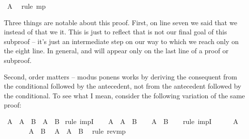 \begin{isabellebody}
\ {\isacharbackquoteopen}A{\isacharbackquoteclose}\ \isamarkupfalse%
\ {\isacharparenleft}rule\ mp{\isacharparenright}\isanewline
\ \ \isamarkupfalse%
\isanewline
{}\isamarkupfalse%
%
\endisatagproof
{\isafoldproof}%
%
\isadelimproof
%
\endisadelimproof
%
\begin{isamarkuptext}%
Three things are notable about this proof. First, on line seven we said that we 
  instead of that we  it. This is just to reflect that 
is not our final goal of this subproof -- it's just an intermediate step on our way to 
which we reach only on the eight line. In general,  and  will appear only
on the last line of a proof or subproof.%
\end{isamarkuptext}\isamarkuptrue%
%
\begin{isamarkuptext}%
Second, order matters -- modus ponens works by deriving the consequent from the conditional 
followed by the antecedent, not from the antecedent followed by the conditional. To see what I mean,
consider the following variation of the same proof:%
\end{isamarkuptext}\isamarkuptrue%
\isamarkupfalse%
\ {\isachardoublequoteopen}{\isacharparenleft}A\ {\isasymlongrightarrow}\ A\ {\isasymlongrightarrow}\ B{\isacharparenright}\ {\isasymlongrightarrow}\ {\isacharparenleft}A\ {\isasymlongrightarrow}\ B{\isacharparenright}{\isachardoublequoteclose}\isanewline
%
\isadelimproof
%
\endisadelimproof
%
\isatagproof
{}\isamarkupfalse%
\ {\isacharparenleft}rule\ impI{\isacharparenright}\isanewline
\ \ \isamarkupfalse%
\ {\isachardoublequoteopen}A\ {\isasymlongrightarrow}\ A\ {\isasymlongrightarrow}\ B{\isachardoublequoteclose}\isanewline
\ \ \isamarkupfalse%
\ {\isachardoublequoteopen}A\ {\isasymlongrightarrow}\ B{\isachardoublequoteclose}\isanewline
\ \ \isamarkupfalse%
\ {\isacharparenleft}rule\ impI{\isacharparenright}\isanewline
\ \ \ \ \isamarkupfalse%
\ {\isachardoublequoteopen}A{\isachardoublequoteclose}\isanewline
\ \ \ \ \isamarkupfalse%
\ \isamarkupfalse%
\ {\isachardoublequoteopen}A\ {\isasymlongrightarrow}\ B{\isachardoublequoteclose}\ \isamarkupfalse%
\ {\isacharbackquoteopen}A\ {\isasymlongrightarrow}\ A\ {\isasymlongrightarrow}\ B{\isacharbackquoteclose}\ \isamarkupfalse%
\ {\isacharparenleft}rule\ rev{\isacharunderscore}mp{\isacharparenright}\isanewline

\end{isabellebody}
